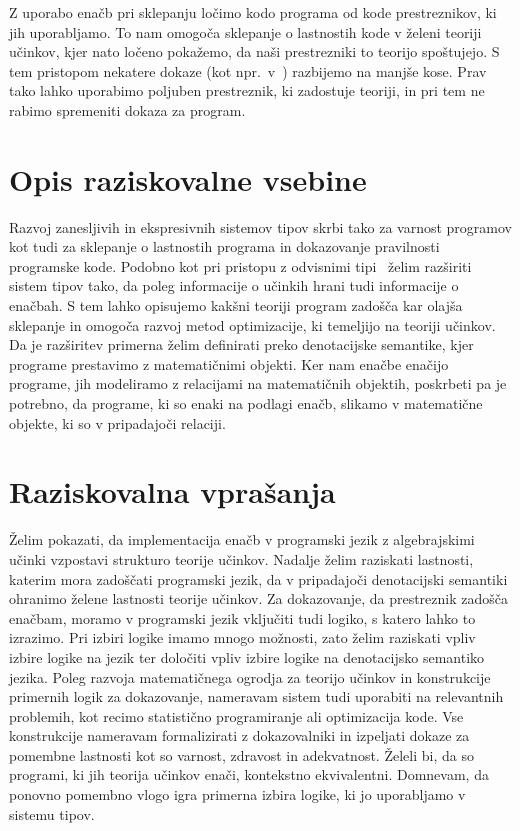 \documentclass{article}
\begin{document}
Z uporabo enačb pri sklepanju ločimo kodo programa od kode prestreznikov, ki jih uporabljamo. To nam omogoča sklepanje o lastnostih kode v želeni teoriji učinkov, kjer nato ločeno pokažemo, da naši prestrezniki to teorijo spoštujejo. S tem pristopom nekatere dokaze (kot npr.\ v~\cite{DBLP:journals/jlp/BauerP15}) razbijemo na manjše kose. Prav tako lahko uporabimo poljuben prestreznik, ki zadostuje teoriji, in pri tem ne rabimo spremeniti dokaza za program.

\section*{Opis raziskovalne vsebine}

Razvoj zanesljivih in ekspresivnih sistemov tipov skrbi tako za varnost programov kot tudi za sklepanje o lastnostih programa in dokazovanje pravilnosti programske kode. Podobno kot pri pristopu z odvisnimi tipi~\cite{DBLP:journals/pacmpl/Ahman18} želim razširiti sistem tipov tako, da poleg informacije o učinkih hrani tudi informacije o enačbah. S tem lahko opisujemo kakšni teoriji program zadošča kar olajša sklepanje in omogoča razvoj metod optimizacije, ki temeljijo na teoriji učinkov. Da je razširitev primerna želim definirati preko denotacijske semantike, kjer programe prestavimo z matematičnimi objekti. Ker nam enačbe enačijo programe, jih modeliramo z relacijami na matematičnih objektih, poskrbeti pa je potrebno, da programe, ki so enaki na podlagi enačb, slikamo v matematične objekte, ki so v pripadajoči relaciji. 

\section*{Raziskovalna vprašanja}

Želim pokazati, da implementacija enačb v programski jezik z algebrajskimi učinki vzpostavi strukturo teorije učinkov. Nadalje želim raziskati lastnosti, katerim mora zadoščati programski jezik, da v pripadajoči denotacijski semantiki ohranimo želene lastnosti teorije učinkov. Za dokazovanje, da prestreznik zadošča enačbam, moramo v programski jezik vključiti tudi logiko, s katero lahko to izrazimo. Pri izbiri logike imamo mnogo možnosti, zato želim raziskati vpliv izbire logike na jezik ter določiti vpliv izbire logike na denotacijsko semantiko jezika. Poleg razvoja matematičnega ogrodja za teorijo učinkov in konstrukcije primernih logik za dokazovanje, nameravam sistem tudi uporabiti na relevantnih problemih, kot recimo statistično programiranje ali optimizacija kode. Vse konstrukcije nameravam formalizirati z dokazovalniki in izpeljati dokaze za pomembne lastnosti kot so varnost, zdravost in adekvatnost. Želeli bi, da so programi, ki jih teorija učinkov enači, kontekstno ekvivalentni. Domnevam, da ponovno pomembno vlogo igra primerna izbira logike, ki jo uporabljamo v sistemu tipov. 
\end{document}
